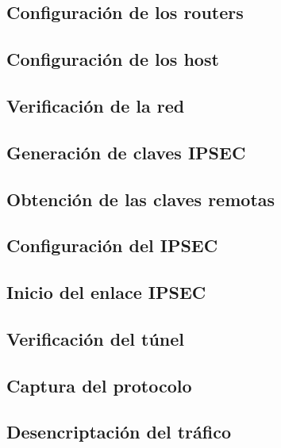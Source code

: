 
\subsection{Configuración de los routers}

\subsection{Configuración de los host}

\subsection{Verificación de la red}

\subsection{Generación de claves IPSEC}

\subsection{Obtención de las claves remotas}

\subsection{Configuración del IPSEC}

\subsection{Inicio del enlace IPSEC}

\subsection{Verificación del túnel}

\subsection{Captura del protocolo}

\subsection{Desencriptación del tráfico}
